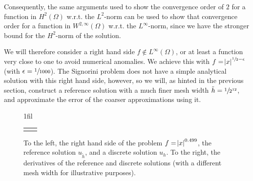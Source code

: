 \documentclass[headsepline,footsepline,footinclude=false,oneside,fontsize=11pt,paper=a4,listof=totoc,bibliography=totoc]{scrbook} %
\makeatletter
\newcommand*{\centerfloat}{%
	\parindent \z@
	\leftskip \z@ \@plus 1fil \@minus \textwidth
	\rightskip\leftskip
	\parfillskip \z@skip}
\makeatother
\begin{document}
Consequently, the same arguments used to show the convergence order of $2$ for a function in $H^2(\Omega)$ w.r.t. the $L^2$-norm can be used to show that convergence order for a function in $W^{2,\infty}(\Omega)$ w.r.t. the $L^\infty$-norm, since we have the stronger bound for the $H^2$-norm of the solution.

We will therefore consider a right hand side $f \notin L^\infty(\Omega)$, or at least a function very close to one to avoid numerical anomalies. We achieve this with $f = \abs{x}^{\sfrac{1}{2} - \epsilon}$ (with $\epsilon = \sfrac{1}{1000}$). The Signorini problem does not have a simple analytical solution with this right hand side, however, so we will, as hinted in the previous section, construct a reference solution with a much finer mesh width $\tilde{h} = \sfrac{1}{2^{12}}$, and approximate the error of the coarser approximations using it.

\begin{figure}[h!]
	\centerfloat
	\begin{tabular}{c@{\hskip -1em}c}
		 & 	
	\end{tabular}
	\caption[Solution to $f = \abs{x}^{\sfrac{1}{2} - \epsilon}$]{To the left, the right hand side of the problem $f = \abs{x}^{0.499}$, the reference solution $u_{\tilde{h}}$, and a discrete solution $u_h$. To the right, the derivatives of the reference and discrete solutions (with a different mesh width for illustrative purposes).}
\end{figure}
\end{document}
